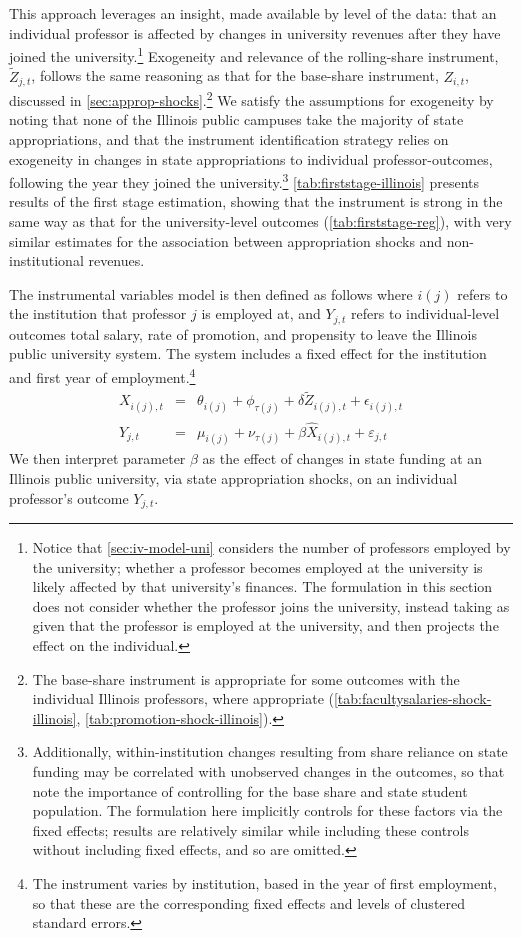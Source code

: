 This approach leverages an insight, made available by level of the data: that an individual professor is affected by changes in university revenues after they have joined the university.\footnote{
    Notice that \autoref{sec:iv-model-uni} considers the number of professors employed by the university; whether a professor becomes employed at the university is likely affected by that university's finances.
    The formulation in this section does not consider whether the professor joins the university, instead taking as given that the professor is employed at the university, and then projects the effect on the individual.
}
Exogeneity and relevance of the rolling-share instrument, $\tilde Z_{j,t}$, follows the same reasoning as that for the base-share instrument, $Z_{i,t}$, discussed in \autoref{sec:approp-shocks}.\footnote{
    The base-share instrument is appropriate for some outcomes with the individual Illinois professors, where appropriate (\autoref{tab:facultysalaries-shock-illinois}, \ref{tab:promotion-shock-illinois}).
}
We satisfy the assumptions for exogeneity by noting that none of the Illinois public campuses take the majority of state appropriations, and that the instrument identification strategy relies on exogeneity in changes in state appropriations to individual professor-outcomes, following the year they joined the university.\footnote{
    Additionally, within-institution changes resulting from share reliance on state funding may be correlated with unobserved changes in the outcomes, so that \cite{NBERw27885} note the importance of controlling for the base share and state student population.
    The formulation here implicitly controls for these factors via the fixed effects; results are relatively similar while including these controls without including fixed effects, and so are omitted.
}
\autoref{tab:firststage-illinois} presents results of the first stage estimation, showing that the instrument is strong in the same way as that for the university-level outcomes (\autoref{tab:firststage-reg}), with very similar estimates for the association between appropriation shocks and non-institutional revenues.

The instrumental variables model is then defined as follows where $i(j)$ refers to the institution that professor $j$ is employed at, and $Y_{j,t}$ refers to individual-level outcomes total salary, rate of promotion, and propensity to leave the Illinois public university system.
The system includes a fixed effect for the institution and first year of employment.\footnote{
    The instrument varies by institution, based in the year of first employment, so that these are the corresponding fixed effects and levels of clustered standard errors.
}
\begin{eqnarray}
    \label{eqn:secondstage1_indiv}
    X_{i(j),t} &=& \theta_{i(j)} + \phi_{\tau(j)} + \delta \tilde Z_{i(j),t} + \epsilon_{i(j),t} \\
    \label{eqn:secondstage2_indiv}
    Y_{j,t} &=& \mu_{i(j)} + \nu_{\tau(j)} + \beta \widehat X_{i(j),t} + \varepsilon_{j,t}
\end{eqnarray}
We then interpret parameter $\beta$ as the effect of changes in state funding at an Illinois public university, via state appropriation shocks, on an individual professor's outcome $Y_{j,t}$.
